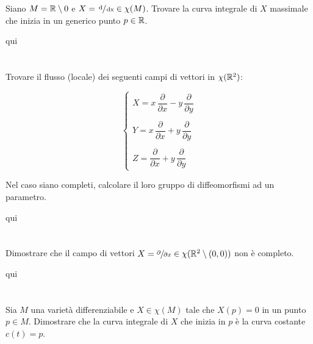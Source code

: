 \begin{tcolorbox}
	Siano $ M = \mathbb{R} \setminus 0 $ e $ X = \sfrac{\operatorname{d}}{\operatorname{dx}} \in \chi(M) $. Trovare la curva integrale di $ X $ massimale che inizia in un generico punto $ p \in \mathbb{R} $.
\end{tcolorbox}

qui

\tocless\section{}\label{es2-30}

\begin{tcolorbox}
	Trovare il flusso (locale) dei seguenti campi di vettori in $ \chi(\mathbb{R}^{2}) $:
	
	\begin{equation}
		\begin{cases}
			X = x \, \dfrac{\partial}{\partial x} - y \, \dfrac{\partial}{\partial y}\\\\
			Y = x \, \dfrac{\partial}{\partial x} + y \, \dfrac{\partial}{\partial y}\\\\
			Z = \dfrac{\partial}{\partial x} + y \, \dfrac{\partial}{\partial y}
		\end{cases}
	\end{equation}

	Nel caso siano completi, calcolare il loro gruppo di diffeomorfismi ad un parametro.
\end{tcolorbox}

qui

\tocless\section{}\label{es2-31}

\begin{tcolorbox}
	Dimostrare che il campo di vettori $ X = \sfrac{\partial}{\partial x} \in \chi(\mathbb{R}^{2} \setminus (0,0)) $ non è completo.
\end{tcolorbox}

qui

\tocless\section{}\label{es2-32}

\begin{tcolorbox}
	Sia $ M $ una varietà differenziabile e $ X \in \chi(M) $ tale che $ X(p) = 0 $ in un punto $ p \in M $. Dimostrare che la curva integrale di $ X $ che inizia in $ p $ è la curva costante $ c(t)=p $.
\end{tcolorbox}

